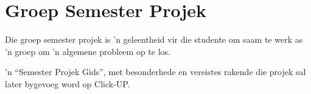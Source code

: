 \section{Groep Semester Projek}
        Die groep semester projek is 'n geleentheid vir die studente om saam te
        werk as 'n groep om 'n algemene probleem op te los.
        
        'n ``Semester Projek Gids'', met besonderhede en vereistes rakende die projek
        sal later bygevoeg word op Click-UP.